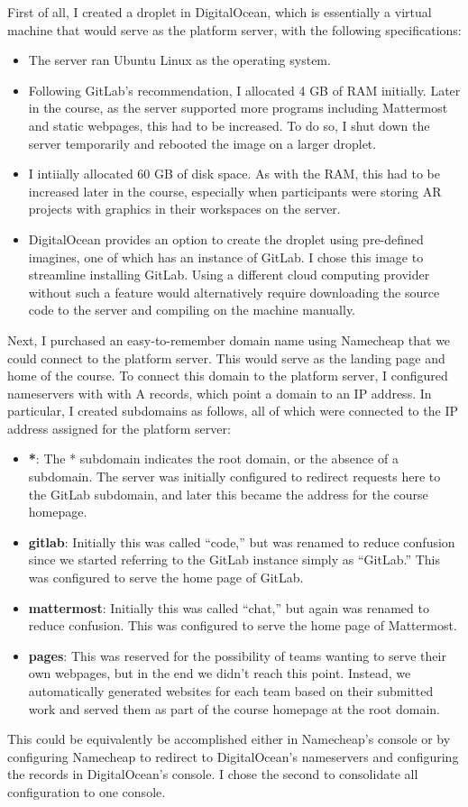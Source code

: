 \documentclass[12pt,twoside,vi]{mitthesis}
\begin{document}
{First of all, I created a droplet in DigitalOcean, which is essentially a virtual machine that would serve as the platform server, with the following specifications:
\begin{itemize}
	\item The server ran Ubuntu Linux as the operating system.
	\item Following GitLab's recommendation, I allocated 4 GB of RAM initially. Later in the course, as the server supported more programs including Mattermost and static webpages, this had to be increased. To do so, I shut down the server temporarily and rebooted the image on a larger droplet.
	\item I intiially allocated 60 GB of disk space. As with the RAM, this had to be increased later in the course, especially when participants were storing AR projects with graphics in their workspaces on the server.
	\item DigitalOcean provides an option to create the droplet using pre-defined imagines, one of which has an instance of GitLab. I chose this image to streamline installing GitLab. Using a different cloud computing provider without such a feature would alternatively require downloading the source code to the server and compiling on the machine manually.
\end{itemize}

Next, I purchased an easy-to-remember domain name using Namecheap that we could connect to the platform server. This would serve as the landing page and home of the course. To connect this domain to the platform server, I configured nameservers with with A records, which point a domain to an IP address. In particular, I created subdomains as follows, all of which were connected to the IP address assigned for the platform server:
\begin{itemize}
\item \textbf{*}: The * subdomain indicates the root domain, or the absence of a subdomain. The server was initially configured to redirect requests here to the GitLab subdomain, and later this became the address for the course homepage.
\item \textbf{gitlab}: Initially this was called ``code,'' but was renamed to reduce confusion since we started referring to the GitLab instance simply as ``GitLab.'' This was configured to serve the home page of GitLab.
\item \textbf{mattermost}: Initially this was called ``chat,'' but again was renamed to reduce confusion. This was configured to serve the home page of Mattermost.
\item \textbf{pages}: This was reserved for the possibility of teams wanting to serve their own webpages, but in the end we didn't reach this point. Instead, we automatically generated websites for each team based on their submitted work and served them as part of the course homepage at the root domain.
\end{itemize}
This could be equivalently be accomplished either in Namecheap's console or by configuring Namecheap to redirect to DigitalOcean's nameservers and configuring the records in DigitalOcean's console. I chose the second to consolidate all configuration to one console.

}
\end{document}
